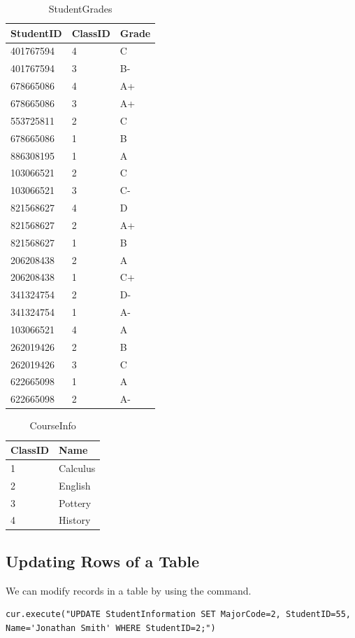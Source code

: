 \begin{problem}
\begin{table}[H]
\begin{tabular}{|l|l|l|}
\hline
StudentID & ClassID & Grade \\
\hline
401767594 & 4 & C \\
401767594 & 3 & B- \\
678665086 & 4 & A+ \\
678665086 & 3 & A+ \\
553725811 & 2 & C \\
678665086 & 1 & B \\
886308195 & 1 & A \\
103066521 & 2 & C \\
103066521 & 3 & C- \\
821568627 & 4 & D \\
821568627 & 2 & A+ \\
821568627 & 1 & B \\
206208438 & 2 & A \\
206208438 & 1 & C+ \\
341324754 & 2 & D- \\
341324754 & 1 & A- \\
103066521 & 4 & A \\
262019426 & 2 & B \\
262019426 & 3 & C \\
622665098 & 1 & A \\
622665098 & 2 & A- \\
\hline
\end{tabular}
\caption{StudentGrades}
\end{table}

\begin{table}[H]
\begin{tabular}{|l|l|}
\hline
ClassID & Name \\
\hline
1 & Calculus \\
2 & English \\
3 & Pottery \\
4 & History \\
\hline
\end{tabular}
\caption{CourseInfo}
\end{table}
\label{prob:sampletables}
\end{problem}

\subsection*{Updating Rows of a Table}
We can modify records in a table by using the  command.
\begin{lstlisting}
cur.execute("UPDATE StudentInformation SET MajorCode=2, StudentID=55, Name='Jonathan Smith' WHERE StudentID=2;")
\end{lstlisting}

